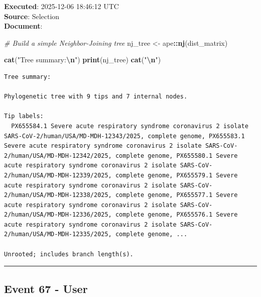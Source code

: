\documentclass[
  11pt,
]{article}
\newenvironment{Shaded}{\begin{snugshade}}{\end{snugshade}}
\newcommand{\CommentTok}[1]{\textcolor[rgb]{0.56,0.35,0.01}{\textit{#1}}}
\newcommand{\FunctionTok}[1]{\textcolor[rgb]{0.13,0.29,0.53}{\textbf{#1}}}
\newcommand{\NormalTok}[1]{#1}
\newcommand{\OtherTok}[1]{\textcolor[rgb]{0.56,0.35,0.01}{#1}}
\newcommand{\SpecialCharTok}[1]{\textcolor[rgb]{0.81,0.36,0.00}{\textbf{#1}}}
\newcommand{\StringTok}[1]{\textcolor[rgb]{0.31,0.60,0.02}{#1}}
\newenvironment{rpoutput}{\vspace{0.5em}\begin{snugshade}}{\end{snugshade}}
\begin{document}
\textbf{Executed}: 2025-12-06 18:46:12 UTC\\
\textbf{Source}: Selection\\
\textbf{Document}:

\begin{Shaded}
\begin{Highlighting}[]
\CommentTok{\# Build a simple Neighbor{-}Joining tree}
\NormalTok{nj\_tree }\OtherTok{\textless{}{-}}\NormalTok{ ape}\SpecialCharTok{::}\FunctionTok{nj}\NormalTok{(dist\_matrix)}

\FunctionTok{cat}\NormalTok{(}\StringTok{"Tree summary:}\SpecialCharTok{\textbackslash{}n}\StringTok{"}\NormalTok{)}
\FunctionTok{print}\NormalTok{(nj\_tree)}
\FunctionTok{cat}\NormalTok{(}\StringTok{"}\SpecialCharTok{\textbackslash{}n}\StringTok{"}\NormalTok{)}
\end{Highlighting}
\end{Shaded}

\begin{rpoutput}

\begin{verbatim}
Tree summary:

Phylogenetic tree with 9 tips and 7 internal nodes.

Tip labels:
  PX655584.1 Severe acute respiratory syndrome coronavirus 2 isolate SARS-CoV-2/human/USA/MD-MDH-12343/2025, complete genome, PX655583.1 Severe acute respiratory syndrome coronavirus 2 isolate SARS-CoV-2/human/USA/MD-MDH-12342/2025, complete genome, PX655580.1 Severe acute respiratory syndrome coronavirus 2 isolate SARS-CoV-2/human/USA/MD-MDH-12339/2025, complete genome, PX655579.1 Severe acute respiratory syndrome coronavirus 2 isolate SARS-CoV-2/human/USA/MD-MDH-12338/2025, complete genome, PX655577.1 Severe acute respiratory syndrome coronavirus 2 isolate SARS-CoV-2/human/USA/MD-MDH-12336/2025, complete genome, PX655576.1 Severe acute respiratory syndrome coronavirus 2 isolate SARS-CoV-2/human/USA/MD-MDH-12335/2025, complete genome, ...

Unrooted; includes branch length(s).
\end{verbatim}

\end{rpoutput}

\begin{center}\rule{0.5\linewidth}{0.5pt}\end{center}

\subsection{Event 67 - User}\label{event-67---user}
\end{document}
